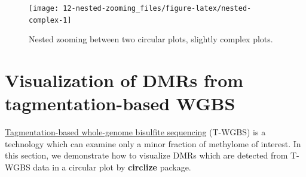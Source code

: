 \documentclass[]{book}
\newenvironment{Shaded}{\begin{snugshade}}{\end{snugshade}}
\newcommand{\KeywordTok}[1]{\textcolor[rgb]{0.13,0.29,0.53}{\textbf{#1}}}
\newcommand{\DataTypeTok}[1]{\textcolor[rgb]{0.13,0.29,0.53}{#1}}
\newcommand{\DecValTok}[1]{\textcolor[rgb]{0.00,0.00,0.81}{#1}}
\newcommand{\FloatTok}[1]{\textcolor[rgb]{0.00,0.00,0.81}{#1}}
\newcommand{\StringTok}[1]{\textcolor[rgb]{0.31,0.60,0.02}{#1}}
\newcommand{\ControlFlowTok}[1]{\textcolor[rgb]{0.13,0.29,0.53}{\textbf{#1}}}
\newcommand{\OperatorTok}[1]{\textcolor[rgb]{0.81,0.36,0.00}{\textbf{#1}}}
\newcommand{\NormalTok}[1]{#1}
\begin{document}
\begin{Shaded}
\end{Shaded}

\begin{figure}

{\centering \texttt{[image: 12-nested-zooming\_files/figure-latex/nested-complex-1]} 

}

\caption{Nested zooming between two circular plots, slightly complex plots.}\label{fig:nested-complex}
\end{figure}

\section{Visualization of DMRs from tagmentation-based
WGBS}\label{visualization-of-dmrs-from-tagmentation-based-wgbs}

\href{http://www.nature.com/nprot/journal/v8/n10/full/nprot.2013.118.html}{Tagmentation-based
whole-genome bisulfite sequencing} (T-WGBS) is a technology which can
examine only a minor fraction of methylome of interest. In this section,
we demonstrate how to visualize DMRs which are detected from T-WGBS data
in a circular plot by \textbf{circlize} package.
\end{document}
